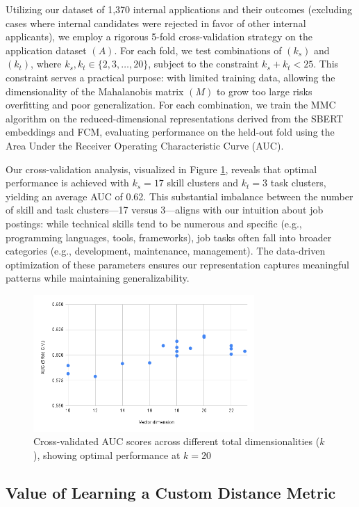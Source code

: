 Utilizing our dataset of 1,370 internal applications and their outcomes (excluding cases where internal
candidates were rejected in favor of other internal applicants), we employ a rigorous 5-fold cross-validation
strategy on the application dataset $(A)$. For each fold, we test combinations of $(k_s)$ and $(k_t)$, where
$k_s, k_t \in \{2, 3, \ldots, 20\}$, subject to the constraint $k_s + k_t < 25$. This constraint serves a
practical purpose: with limited training data, allowing the dimensionality of the Mahalanobis matrix $(M)$
to grow too large risks overfitting and poor generalization. For each combination, we train the MMC algorithm
on the reduced-dimensional representations derived from the SBERT embeddings and FCM, evaluating performance
on the held-out fold using the Area Under the Receiver Operating Characteristic Curve (AUC).

Our cross-validation analysis, visualized in Figure \ref{fig:AUC}, reveals that optimal performance
is achieved with $k_s = 17$ skill clusters and $k_t = 3$ task clusters, yielding an average AUC of 0.62.
This substantial imbalance between the number of skill and task clusters---17 versus 3---aligns with our intuition
about job postings: while technical skills tend to be numerous and specific (e.g., programming languages,
tools, frameworks), job tasks often fall into broader categories (e.g., development, maintenance, management).
The data-driven optimization of these parameters ensures our representation captures meaningful patterns while
maintaining generalizability.

\begin{figure}[htb]
\centering
\includegraphics[width=0.75\textwidth]{new_img/chart.png}
\caption{Cross-validated AUC scores across different total dimensionalities ($k$), showing optimal performance at $k = 20$}
\label{fig:AUC}
\end{figure}

\subsection{Value of Learning a Custom Distance Metric}

